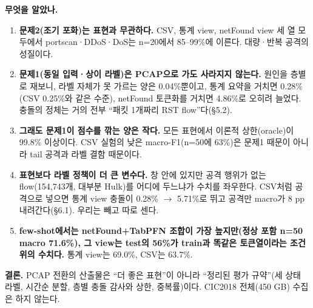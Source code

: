 \textbf{무엇을 알았나.}
\begin{enumerate}
\item \textbf{문제2(조기 포화)는 표현과 무관하다.} CSV, 통계 view, netFound view 세 열 모두에서 portscan·DDoS·DoS는 n=20에서 85--99\%에 이른다. 대량·반복 공격의 성질이다.
\item \textbf{문제1(동일 입력·상이 라벨)은 PCAP으로 가도 사라지지 않는다.} 원인을 층별로 재보니, 라벨 자체가 못 가르는 양은 0.04\%뿐이고, 통계 요약을 거치면 0.28\%(CSV 0.25\%와 같은 수준), netFound 토큰화를 거치면 4.86\%로 오히려 늘었다. 충돌의 정체는 거의 전부 ``패킷 1개짜리 RST flow''다(\S5.2).
\item \textbf{그래도 문제1이 점수를 깎는 양은 작다.} 모든 표현에서 이론적 상한(oracle)이 99.8\% 이상이다. CSV 실험의 낮은 macro-F1(n=50에 63\%)은 문제1 때문이 아니라 tail 공격과 라벨 결함 때문이다.
\item \textbf{표현보다 라벨 정책이 더 큰 변수다.} 창 안에 있지만 공격 행위가 없는 flow(154,743개, 대부분 Hulk)를 어디에 두느냐가 수치를 좌우한다. CSV처럼 공격으로 넣으면 통계 view 충돌이 0.28\% $\to$ 5.71\%로 뛰고 공격만 macro가 8 pp 내려간다(\S6.1). 우리는 빼고 따로 센다.
\item \textbf{few-shot에서는 netFound+TabPFN 조합이 가장 높지만(정상 포함 n=50 macro 71.6\%), 그 view는 test의 56\%가 train과 똑같은 토큰열이라는 조건 위의 수치다.} 통계 view는 69.0\%, CSV는 63.7\%.
\end{enumerate}

\textbf{결론.} PCAP 전환의 산출물은 ``더 좋은 표현''이 아니라 ``정리된 평가 규약''(세 상태 라벨, 시간순 분할, 층별 충돌 감사와 상한, 중복률)이다. CIC2018 전체(450 GB) 수집은 하지 않는다.

